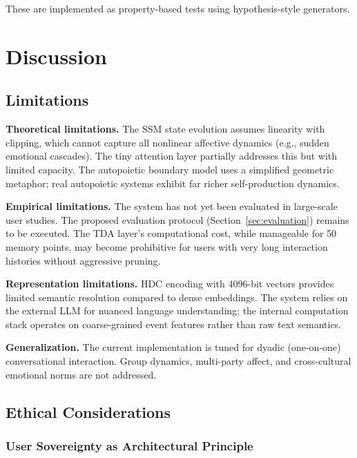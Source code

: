 \documentclass[10pt,twocolumn]{article}
\begin{document}
These are implemented as property-based tests using hypothesis-style generators.

\section{Discussion}
\label{sec:discussion}

\subsection{Limitations}

\textbf{Theoretical limitations.} The SSM state evolution assumes linearity with clipping, which cannot capture all nonlinear affective dynamics (e.g., sudden emotional cascades). The tiny attention layer partially addresses this but with limited capacity. The autopoietic boundary model uses a simplified geometric metaphor; real autopoietic systems exhibit far richer self-production dynamics.

\textbf{Empirical limitations.} The system has not yet been evaluated in large-scale user studies. The proposed evaluation protocol (Section~\ref{sec:evaluation}) remains to be executed. The TDA layer's computational cost, while manageable for 50 memory points, may become prohibitive for users with very long interaction histories without aggressive pruning.

\textbf{Representation limitations.} HDC encoding with 4096-bit vectors provides limited semantic resolution compared to dense embeddings. The system relies on the external LLM for nuanced language understanding; the internal computation stack operates on coarse-grained event features rather than raw text semantics.

\textbf{Generalization.} The current implementation is tuned for dyadic (one-on-one) conversational interaction. Group dynamics, multi-party affect, and cross-cultural emotional norms are not addressed.

\subsection{Ethical Considerations}

\subsubsection{User Sovereignty as Architectural Principle}
\end{document}
